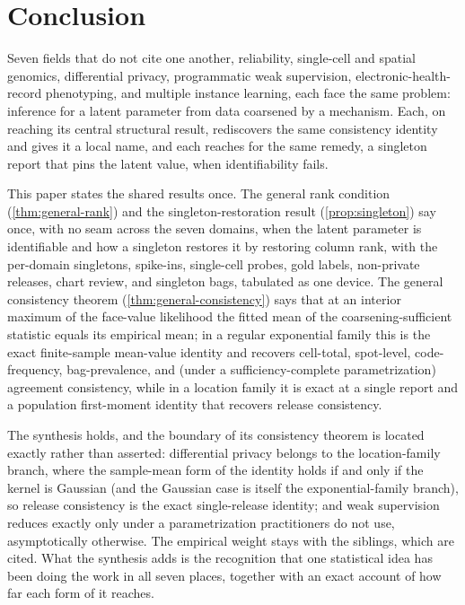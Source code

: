 \section{Conclusion}
\label{sec:conclusion}

Seven fields that do not cite one another, reliability, single-cell and
spatial genomics, differential privacy, programmatic weak supervision,
electronic-health-record phenotyping, and multiple instance learning,
each face the same problem:
inference for a latent parameter from data coarsened by a mechanism.
Each, on reaching its central structural result, rediscovers the same
consistency identity and gives it a local name, and each reaches for the
same remedy, a singleton report that pins the latent value, when
identifiability fails.

This paper states the shared results once. The general rank condition
(\cref{thm:general-rank}) and the singleton-restoration result
(\cref{prop:singleton}) say once, with no seam across the seven domains,
when the latent parameter is identifiable and how a singleton restores
it by restoring column rank, with the per-domain singletons, spike-ins,
single-cell probes, gold labels, non-private releases, chart review, and
singleton bags, tabulated as one device. The general consistency theorem
(\cref{thm:general-consistency}) says that at an interior maximum of the
face-value likelihood the fitted mean of the coarsening-sufficient
statistic equals its empirical mean; in a regular exponential family
this is the exact finite-sample mean-value identity and recovers
cell-total, spot-level, code-frequency, bag-prevalence, and (under a
sufficiency-complete parametrization) agreement consistency, while in a
location family it is
exact at a single report and a population first-moment identity that
recovers release consistency.

The synthesis holds, and the boundary of its consistency theorem is
located exactly rather than asserted: differential privacy belongs to
the location-family branch, where the sample-mean form of the identity
holds if and only if the kernel is Gaussian (and the Gaussian case is
itself the exponential-family branch), so release consistency is the
exact single-release identity; and weak supervision reduces exactly only
under a parametrization practitioners do not use, asymptotically
otherwise. The empirical weight stays with the siblings, which are
cited. What the synthesis adds is the recognition that one statistical
idea has been doing the work in all seven places, together with an exact
account of how far each form of it reaches.
